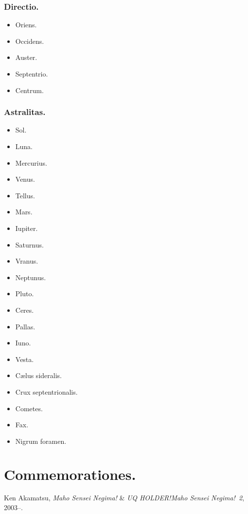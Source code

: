 \documentclass[12pt]{book}
\begin{document}
\subsection{Directio.}\label{directio}

\begin{itemize}
  \item Oriens.
  \item Occidens.
  \item Auster.
  \item Septentrio.
  \item Centrum.
\end{itemize}

\subsection{Astralitas.}\label{astralitas}

\begin{itemize}
  \item Sol.
  \item Luna.
  \item Mercurius.
  \item Venus.
  \item Tellus.
  \item Mars.
  \item Iupiter.
  \item Saturnus.
  \item Vranus.
  \item Neptunus.
  \item Pluto.
  \item Ceres.
  \item Pallas.
  \item Iuno.
  \item Vesta.
  \item Cælus sideralis.
  \item Crux septentrionalis.
  \item Cometes.
  \item Fax.
  \item Nigrum foramen.
\end{itemize}


\backmatter
\chapter{Commemorationes.}\label{sources}
\newcommand{\bookname}[1]{\textenglish{\emph{#1}}}
Ken Akamatsu, \bookname{Maho Sensei Negima!} \& \bookname{UQ HOLDER!\@ Maho Sensei Negima!~2}, 2003--.
\end{document}
